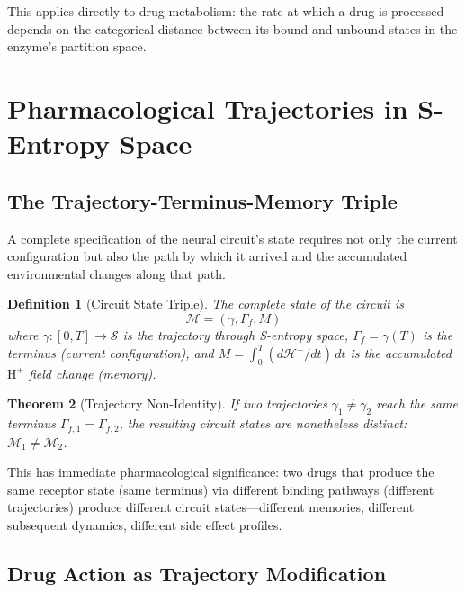 \documentclass[twocolumn,10pt]{article}
\newtheorem{theorem}{Theorem}[section]
\newtheorem{definition}[theorem]{Definition}
\theoremstyle{remark}
\newcommand{\Hplus}{\mathrm{H}^{+}}
\newcommand{\Mstate}{\mathcal{M}}
\newcommand{\Sspace}{\mathcal{S}}
\newcommand{\Gstate}{\Gamma}
\newcommand{\Hfield}{\mathcal{H}^+}
\begin{document}
This applies directly to drug metabolism: the rate at which a drug is processed depends on the categorical distance between its bound and unbound states in the enzyme's partition space.

\section{Pharmacological Trajectories in S-Entropy Space}
\label{sec:trajectories}

\subsection{The Trajectory-Terminus-Memory Triple}

A complete specification of the neural circuit's state requires not only the current configuration but also the path by which it arrived and the accumulated environmental changes along that path.

\begin{definition}[Circuit State Triple]
\label{def:triple}
The complete state of the circuit is
\begin{equation}
  \boxed{\Mstate = (\gamma, \Gstate_f, M)}
\end{equation}
where $\gamma: [0, T] \to \Sspace$ is the trajectory through S-entropy space, $\Gstate_f = \gamma(T)$ is the terminus (current configuration), and $M = \int_0^T (d\Hfield/dt)\,dt$ is the accumulated $\Hplus$ field change (memory).
\end{definition}

\begin{theorem}[Trajectory Non-Identity]
\label{thm:nonidentity}
If two trajectories $\gamma_1 \neq \gamma_2$ reach the same terminus $\Gstate_{f,1} = \Gstate_{f,2}$, the resulting circuit states are nonetheless distinct: $\Mstate_1 \neq \Mstate_2$.
\end{theorem}

This has immediate pharmacological significance: two drugs that produce the same receptor state (same terminus) via different binding pathways (different trajectories) produce different circuit states---different memories, different subsequent dynamics, different side effect profiles.

\subsection{Drug Action as Trajectory Modification}
\end{document}
